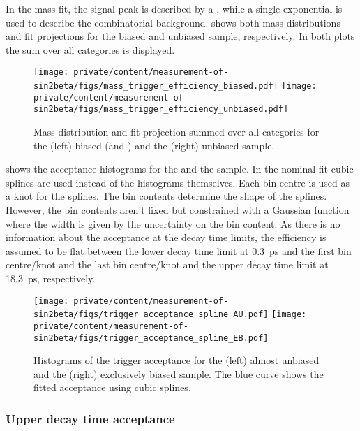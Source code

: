 In the mass fit, the signal peak is described by a \Ipatia \PDF, while a single
exponential is used to describe the combinatorial background.
shows both mass distributions and fit projections for the biased and unbiased
sample, respectively. In both plots the sum over all categories is displayed.
%
\begin{figure}
\texttt{[image: private/content/measurement-of-sin2beta/figs/mass\_trigger\_efficiency\_biased.pdf]}
\texttt{[image: private/content/measurement-of-sin2beta/figs/mass\_trigger\_efficiency\_unbiased.pdf]}
\caption{Mass distribution and fit projection summed over all categories for
the (left) biased (\catAU and \catEB) and the (right) unbiased sample.}
\label{fig:measurement_of_sin2beta:resolution_and_acceptance:acceptance:lower:mass_fits}
\end{figure}
%
shows the acceptance histograms for the \catAU and the \catEB sample. In the
nominal fit cubic splines \cite{Karbach:2014qba} are used instead of the
histograms themselves. Each bin centre is used as a knot for the splines. The
bin contents determine the shape of the splines. However, the bin contents
aren't fixed but constrained with a Gaussian function where the width is given
by the uncertainty on the bin content. As there is no information about the
acceptance at the decay time limits, the efficiency is assumed to be flat
between the lower decay time limit at \SI{0.3}{\ps} and the first bin
centre/knot and the last bin centre/knot and the upper decay time limit at
\SI{18.3}{\ps}, respectively.
%
\begin{figure}
\texttt{[image: private/content/measurement-of-sin2beta/figs/trigger\_acceptance\_spline\_AU.pdf]}
\texttt{[image: private/content/measurement-of-sin2beta/figs/trigger\_acceptance\_spline\_EB.pdf]}
\caption{Histograms of the trigger acceptance for the (left) almost unbiased and
the (right) exclusively biased sample. The blue curve shows the fitted
acceptance using cubic splines.}
\label{fig:measurement_of_sin2beta:resolution_and_acceptance:acceptance:lower:splines}
\end{figure}

\subsubsection{Upper decay time acceptance}
\label{sec:measurement_of_sin2beta:resolution_and_acceptance:acceptance:upper}

